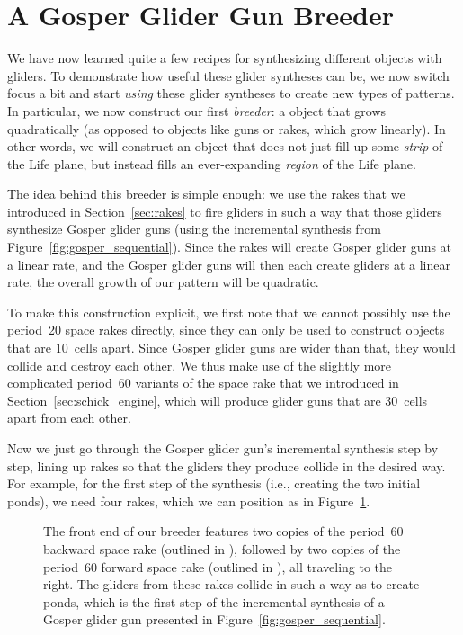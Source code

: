 \section{A Gosper Glider Gun Breeder}\label{sec:gosper_breeder}

We have now learned quite a few recipes for synthesizing different objects with gliders. To demonstrate how useful these glider syntheses can be, we now switch focus a bit and start \emph{using} these glider syntheses to create new types of patterns. In particular, we now construct our first \emph{breeder}: a object that grows quadratically (as opposed to objects like guns or rakes, which grow linearly). In other words, we will construct an object that does not just fill up some \emph{strip} of the Life plane, but instead fills an ever-expanding \emph{region} of the Life plane.

The idea behind this breeder is simple enough: we use the rakes that we introduced in Section~\ref{sec:rakes} to fire gliders in such a way that those gliders synthesize Gosper glider guns (using the incremental synthesis from Figure~\ref{fig:gosper_sequential}). Since the rakes will create Gosper glider guns at a linear rate, and the Gosper glider guns will then each create gliders at a linear rate, the overall growth of our pattern will be quadratic.

To make this construction explicit, we first note that we cannot possibly use the period~20 space rakes directly, since they can only be used to construct objects that are 10~cells apart. Since Gosper glider guns are wider than that, they would collide and destroy each other. We thus make use of the slightly more complicated period~60 variants of the space rake that we introduced in Section~\ref{sec:schick_engine}, which will produce glider guns that are 30~cells apart from each other.

Now we just go through the Gosper glider gun's incremental synthesis step by step, lining up rakes so that the gliders they produce collide in the desired way. For example, for the first step of the synthesis (i.e., creating the two initial ponds), we need four rakes, which we can position as in Figure~\ref{fig:breeder_front}.

\begin{figure}[!htb]
	\centering
	\caption{The front end of our breeder features two copies of the period~60 backward space rake (outlined in ), followed by two copies of the period~60 forward space rake (outlined in ), all traveling to the right. The gliders from these rakes collide in such a way as to create ponds, which is the first step of the incremental synthesis of a Gosper glider gun presented in Figure~\ref{fig:gosper_sequential}.}\label{fig:breeder_front}
\end{figure}

